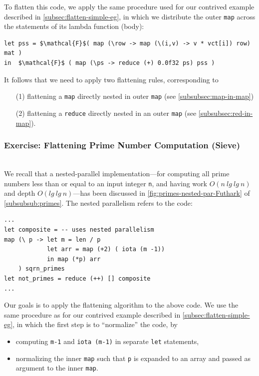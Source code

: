 \documentclass[acmsmall,review]{acmart}\settopmatter{printfolios=true,printccs=false,printacmref=false}
\begin{document}
To flatten this code, we apply the same procedure used for our contrived
example described in \cref{subsec:flatten-simple-eg}, in which we distribute
the outer \lstinline{map} across the statements of its lambda function (body):
\begin{lstlisting}[mathescape=true]
let pss = $\mathcal{F}$( map (\row -> map (\(i,v) -> v * vct[i]) row) mat )
in  $\mathcal{F}$ ( map (\ps -> reduce (+) 0.0f32 ps) pss )
\end{lstlisting}\vspace{-2ex}
It follows that we need to apply two flattening rules, corresponding to
\begin{itemize}
    \item[(1)] flattening a \lstinline{map} directly nested in outer 
                \lstinline{map} (see \cref{subsubsec:map-in-map})
    \item[(2)] flattening a \lstinline{reduce} directly nested in an
                outer \lstinline{map} (see \cref{subsubsec:red-in-map}).
\end{itemize}

\subsubsection{Exercise: Flattening Prime Number Computation (Sieve)}
\label{exercise:flat-primes}
$\mbox{ }$\\

We recall that a nested-parallel implementation---for computing all prime numbers 
less than or equal to an input integer {\tt n}, and having work $O(n~lg~lg~n)$ 
and depth $O(lg~lg~n)$---has been discussed in \cref{fig:primes-nested-par-Futhark}
of \cref{subsubsub:primes}. The nested parallelism refers to the code:
\begin{lstlisting}[mathescape=true]
...
let composite = -- uses nested parallelism
map (\ p -> let m = len / p
            let arr = map (+2) ( iota (m -1))
            in map (*p) arr
    ) sqrn_primes
let not_primes = reduce (++) [] composite
...
\end{lstlisting}\vspace{-2ex}
Our goals is to apply the flattening algorithm to the above code.
We use the same procedure as for our contrived example described 
in \cref{subsec:flatten-simple-eg}, in which the first step is to
``normalize'' the code, by 
\begin{itemize}
    \item computing {\tt m-1} and \lstinline{iota (m-1)} in
            separate \lstinline{let} statements,
    \item normalizing the inner \lstinline{map} such that
            {\tt p} is expanded to an array and passed as
            argument to the inner \lstinline{map}.
\end{itemize}
\end{document}
